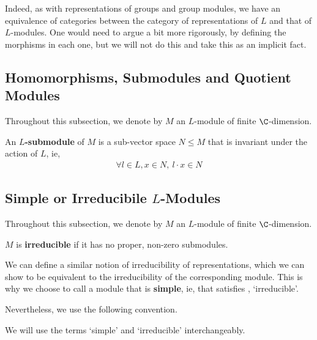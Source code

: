 Indeed, as with representations of groups and group modules, we have an equivalence of categories between the category of representations of $L$ and that of $L$-modules. One would need to argue a bit more rigorously, by defining the morphisms in each one, but we will not do this and take this as an implicit fact.

\subsection{Homomorphisms, Submodules and Quotient Modules}

Throughout this subsection, we denote by $M$ an $L$-module of finite $\C$-dimension.

\begin{boxdefinition}
    An \textbf{$L$-submodule} of $M$ is a sub-vector space $N \leq M$ that is invariant under the action of $L$, ie,
    \begin{align*}
        \forall l \in L, x \in N, \ l \cdot x \in N
    \end{align*}
\end{boxdefinition}



\sorry %

\subsection{Simple or Irreducibile $L$-Modules}

Throughout this subsection, we denote by $M$ an $L$-module of finite $\C$-dimension.

\begin{boxdefinition}[Irreducibility]\label{Ch2:Def:IrreducibleModule}
    $M$ is \textbf{irreducible} if it has no proper, non-zero submodules.
\end{boxdefinition}
\begin{remark}
    We can define a similar notion of irreducibility of representations, which we can show to be equivalent to the irreducibility of the corresponding module. This is why we choose to call a module that is \textbf{simple}, ie, that satisfies , `irreducible'.
\end{remark}
Nevertheless, we use the following convention.
\begin{boxconvention}
    We will use the terms `simple' and `irreducible' interchangeably.
\end{boxconvention}

